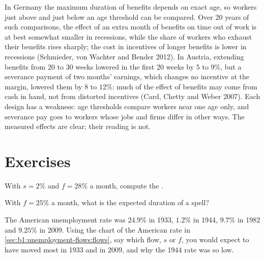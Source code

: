 \begin{debate}
In Germany the maximum duration of benefits depends on exact age, so
workers just above and just below an age threshold can be compared. Over
20 years of such comparisons, the effect of an extra month of benefits on
time out of work is at best somewhat smaller in recessions, while the share
of workers who exhaust their benefits rises sharply; the cost in
incentives of longer benefits is lower in recessions (Schmieder, von
Wachter and Bender 2012). %
In Austria, extending benefits from 20 to 30 weeks lowered 
in the first 20 weeks by $5$ to $9\%$, but a severance payment of two months'
earnings, which changes no incentive at the margin, lowered them by $8$ to
$12\%$: much of the effect of benefits may come from cash in hand, not from
distorted incentives (Card, Chetty and Weber 2007). %
Each design has a weakness: age thresholds compare workers near one age
only, and severance pay goes to workers whose jobs and firms differ in
other ways. The measured effects are clear; their reading is not.
\end{debate}

\section*{Exercises}\label{sec:b1:unemployment-flows:exercises}

\begin{exercise}[$\star$]\label{exo:b1:unemployment-flows:ustar}
With $s = 2\%$ and $f = 28\%$ a month, compute the .
\end{exercise}

\begin{exercise}[$\star$]\label{exo:b1:unemployment-flows:dur}
With $f = 25\%$ a month, what is the expected duration of a spell?
\end{exercise}

\begin{exercise}[$\star$]\label{exo:b1:unemployment-flows:read}
The American unemployment rate was $24.9\%$ in 1933, $1.2\%$ in 1944, $9.7\%$ in
1982 and $9.25\%$ in 2009. %
Using the chart of the American rate in \cref{sec:b1:unemployment-flows:flows},
say which flow, $s$ or $f$, you would expect to have moved most in 1933 and in
2009, and why the 1944 rate was so low.
\end{exercise}

